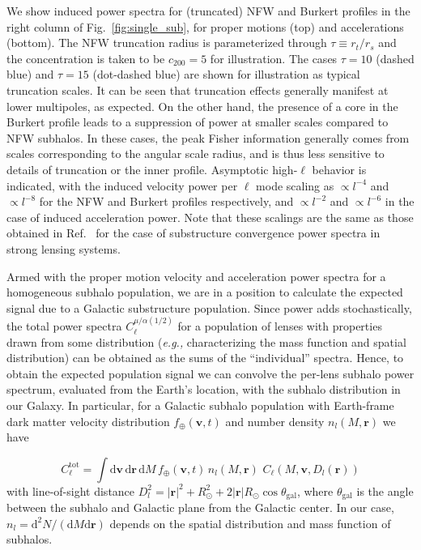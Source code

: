 \documentclass[prd,aps,10pt,nofootinbib,twocolumn,superscriptaddress,preprintnumbers,balancelastpage,longbibliography]{revtex4-1}
\newcommand{\vect}[1]{\boldsymbol{\mathbf{#1}}}
\newcommand{\dd}{\mathrm{d}}
\newcommand{\sun}{\odot}
\begin{document}
We show induced power spectra for (truncated) NFW and Burkert profiles in the right column of Fig.~\ref{fig:single_sub}, for proper motions (top) and accelerations (bottom). The NFW truncation radius is parameterized through $\tau\equiv r_t/r_s$ and the concentration is taken to be $c_{200}=5$ for illustration. The cases $\tau=10$ (dashed blue) and $\tau=15$ (dot-dashed blue) are shown for illustration as typical truncation scales. It can be seen that truncation effects generally manifest at lower multipoles, as expected. On the other hand, the presence of a core in the Burkert profile leads to a suppression of power at smaller scales compared to NFW subhalos. In these cases, the peak Fisher information generally comes from scales corresponding to the angular scale radius, and is thus less sensitive to details of truncation or the inner profile. Asymptotic high-$\ell$ behavior is indicated, with the induced velocity power per $\ell$ mode scaling as $\propto l^{-4}$ and $\propto l^{-8}$ for the NFW and Burkert profiles respectively, and $\propto l^{-2}$ and $\propto l^{-6}$ in the case of induced acceleration power. Note that these scalings are the same as those obtained in Ref.~\cite{Rivero:2017mao} for the case of substructure convergence power spectra in strong lensing systems. 

Armed with the proper motion velocity and acceleration power spectra for a homogeneous subhalo population, we are in a position to calculate the expected signal due to a Galactic substructure population. Since power adds stochastically, the total power spectra $C_\ell^{\mu/\alpha(1/2)}$ for a population of lenses with properties drawn from some distribution (\emph{e.g.,} characterizing the mass function and spatial distribution) can be obtained as the sums of the ``individual'' spectra. Hence, to obtain the expected population signal we can convolve the per-lens subhalo power spectrum, evaluated from the Earth's location, with the subhalo distribution in our Galaxy. In particular, for a Galactic subhalo population with Earth-frame dark matter velocity distribution $f_\oplus(\mathbf v, t)$ and number density $n_l(M, \mathbf r)$ we have 

\begin{equation}
C_\ell^{\mathrm{tot}}=\int \dd \mathbf v \,\dd \mathbf r \,\dd M\,f_\oplus(\mathbf v, t)\,n_l(M, \mathbf r)\,\,C_\ell(M, \mathbf{v}, D_l(\mathbf{r}))
\label{eqn:popcell}
\end{equation}
with line-of-sight distance $D_l^2 = |\vect{r}|^2 + R_\sun^2 +2|\vect{r}|R_\sun\cos\theta_\mathrm{gal}$, where $\theta_\mathrm{gal}$ is the angle between the subhalo and Galactic plane from the Galactic center. In our case, $n_l = \dd^2N/(\dd M \dd \mathbf r)$ depends on the spatial distribution and mass function of subhalos.
\end{document}

